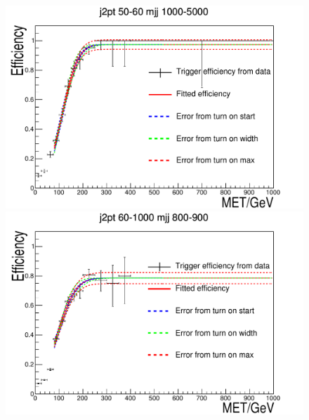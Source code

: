 \begin{figure}
\begin{center}
    \includegraphics[width=.6\largefigwidth]{plots/parked/trigfitplots/hData_MET_1D_35D.pdf}
    \includegraphics[width=.6\largefigwidth]{plots/parked/trigfitplots/hData_MET_1D_43D.pdf}


\end{center}
\end{figure}
